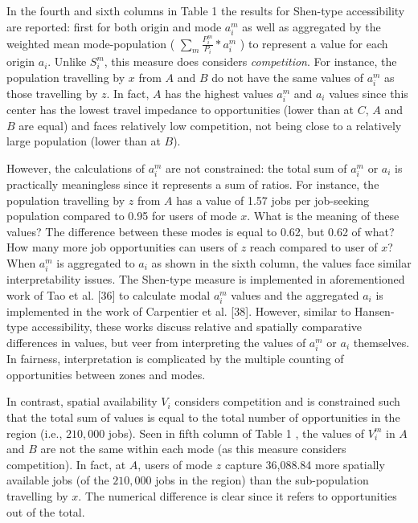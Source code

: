 \documentclass[10pt,letterpaper]{article}
\begin{document}
In the fourth and sixth columns in Table 1 the results for Shen-type
accessibility are reported: first for both origin and mode \(a_i^m\) as
well as aggregated by the weighted mean mode-population (
\(\sum_m \frac{P_i^m}{P_i}*a_i^m\) ) to represent a value for each
origin \(a_i\). Unlike \(S_i^m\), this measure does considers
\emph{competition}. For instance, the population travelling by \(x\)
from \(A\) and \(B\) do not have the same values of \(a_i^m\) as those
travelling by \(z\). In fact, \(A\) has the highest values \(a_i^m\) and
\(a_i\) values since this center has the lowest travel impedance to
opportunities (lower than at \(C\), \(A\) and \(B\) are equal) and faces
relatively low competition, not being close to a relatively large
population (lower than at \(B\)).

However, the calculations of \(a_i^m\) are not constrained: the total
sum of \(a_i^m\) or \(a_i\) is practically meaningless since it
represents a sum of ratios. For instance, the population travelling by
\(z\) from \(A\) has a value of 1.57 jobs per job-seeking population
compared to 0.95 for users of mode \(x\). What is the meaning of these
values? The difference between these modes is equal to 0.62, but 0.62 of
what? How many more job opportunities can users of \(z\) reach compared
to user of \(x\)? When \(a_i^m\) is aggregated to \(a_i\) as shown in
the sixth column, the values face similar interpretability issues. The
Shen-type measure is implemented in aforementioned work of Tao et al.
{[}36{]} to calculate modal \(a_i^m\) values and the aggregated \(a_i\)
is implemented in the work of Carpentier et al. {[}38{]}. However,
similar to Hansen-type accessibility, these works discuss relative and
spatially comparative differences in values, but veer from interpreting
the values of \(a_i^m\) or \(a_i\) themselves. In fairness,
interpretation is complicated by the multiple counting of opportunities
between zones and modes.

In contrast, spatial availability \(V_i\) considers competition and is
constrained such that the total sum of values is equal to the total
number of opportunities in the region (i.e., \(210,000\) jobs). Seen in
fifth column of Table 1 , the values of \(V_i^m\) in \(A\) and \(B\) are
not the same within each mode (as this measure considers competition).
In fact, at \(A\), users of mode \(z\) capture 36,088.84 more spatially
available jobs (of the \(210,000\) jobs in the region) than the
sub-population travelling by \(x\). The numerical difference is clear
since it refers to opportunities out of the total.
\end{document}
